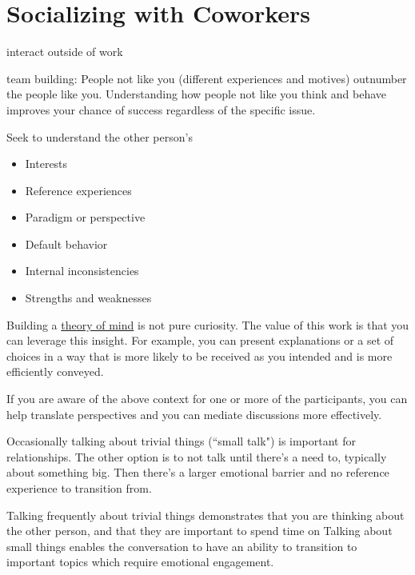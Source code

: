 \section{Socializing with Coworkers\label{sec:socializing}}

interact outside of work

team building:
People not like you (different experiences and motives) outnumber the people like you.
Understanding how people not like you think and behave improves your chance of success regardless of the specific issue.

Seek to understand the other person's
\begin{itemize}
\item Interests
\item Reference experiences
\item Paradigm or perspective
\item Default behavior
\item Internal inconsistencies
\item Strengths and weaknesses
\end{itemize}

Building a \href{https://en.wikipedia.org/wiki/Theory_of_mind}{theory of mind}
is not pure curiosity. The value of this work is that you can leverage this insight. For example, you can present explanations or a set of choices in a way that is more likely to be received as you intended and is more efficiently conveyed.  

If you are aware of the above context for one or more of the participants, you can help translate perspectives and you can mediate discussions more effectively. 

Occasionally talking about trivial things (``small talk") is important for relationships.
The other option is to not talk until there's a need to, typically about something big. Then there's a larger emotional barrier and no reference experience to transition from.

Talking frequently about trivial things demonstrates that you are thinking about the other person, and that they are important to spend time on
Talking about small things enables the conversation to have an ability to transition to important topics which require emotional engagement.

